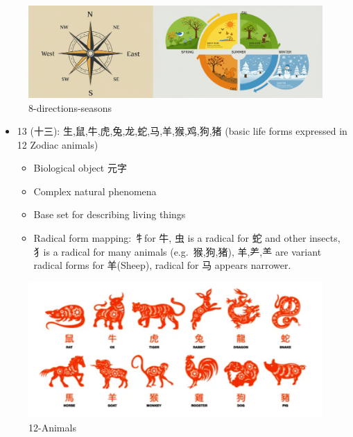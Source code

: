 \begin{figure}
\centering
\includegraphics{./images/8-directions-seasons.png}
\caption{8-directions-seasons}
\end{figure}

\begin{itemize}
\tightlist
\item
  13 (十三): 生,鼠,牛,虎,兔,龙,蛇,马,羊,猴,鸡,狗,猪 (basic life forms
  expressed in 12 Zodiac animals)

  \begin{itemize}
  \tightlist
  \item
    Biological object 元字
  \item
    Complex natural phenomena
  \item
    Base set for describing living things
  \item
    Radical form mapping: 牜for 牛, 虫 is a radical for 蛇 and other
    insects, 犭is a radical for many animals (e.g.~猴,狗,猪), 羊,⺶,⺷
    are variant radical forms for 羊(Sheep), radical for 马 appears
    narrower.
  \end{itemize}
\end{itemize}

\begin{figure}
\centering
\includegraphics{./images/12-zodiac-animals.png}
\caption{12-Animals}
\end{figure}

